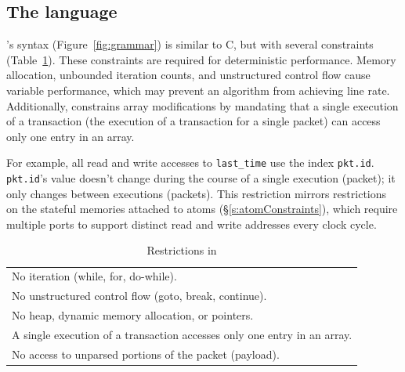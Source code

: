 \subsection{The \pktlanguage language}
\label{ss:constraints}
\pktlanguage's syntax (Figure~\ref{fig:grammar}) is similar to C, but with
several constraints (Table~\ref{tab:restrict}).  These constraints are required
for deterministic performance.  Memory allocation, unbounded iteration counts,
and unstructured control flow cause variable performance, which may prevent an
algorithm from achieving line rate.  Additionally, \pktlanguage constrains
array modifications by mandating that a single execution of a transaction (the
execution of a transaction for a single packet) can access only one entry in an
array.

For example, all read and write accesses to \texttt{last\_time} use the
index \texttt{pkt.id}. \texttt{pkt.id}'s value doesn't change during the
course of a single execution (packet); it only changes between executions
(packets).  This restriction mirrors restrictions on the stateful memories
attached to atoms (\S\ref{s:atomConstraints}), which require multiple ports to
support distinct read and write addresses every clock cycle.

\begin{table}
  \begin{tabular}{p{}}
   No iteration (while, for, do-while).\\
   No unstructured control flow (goto, break, continue).\\
   No heap, dynamic memory allocation, or pointers.\\
   A single execution of a transaction accesses only one entry in an array.\\
   No access to unparsed portions of the packet (payload).\\
  \end{tabular}
  \caption{Restrictions in \pktlanguage}
  \label{tab:restrict}
\end{table}

